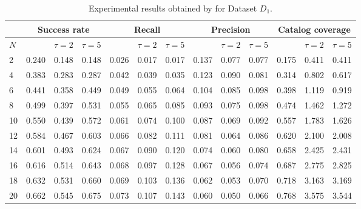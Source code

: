 \begin{table*}[t!]
	\small
\caption{Experimental results obtained by \TFb for Dataset $D_{1}$.}
\begin{tabular}{|l | lll| lll |lll |lll|}
	\hline
	& \multicolumn{3}{c|}{\textbf{Success rate}} & \multicolumn{3}{c|}{\textbf{Recall}} & \multicolumn{3}{c|}{\textbf{Precision}} & \multicolumn{3}{c|}{ \textbf{Catalog coverage}} \\ \hline
	$N$  & \MNB     & $\tau=2$   & $\tau=5$  & \MNB      & $\tau=2$   & $\tau=5$   & \MNB       & $\tau=2$   & $\tau=5$    & \MNB        & $\tau=2$     & $\tau=5$      \\ \hline         
2        & 0.240 & 0.148   & 0.148  & 0.026 & 0.017   & 0.017   & 0.137 & 0.077   & 0.077     & 0.175 & 0.411  & 0.411   \\ \hline
4        & 0.383 & 0.283   & 0.287  & 0.042 & 0.039   & 0.035   & 0.123 & 0.090   & 0.081     & 0.314 & 0.802  & 0.617   \\ \hline
6        & 0.441 & 0.358   & 0.449  & 0.049 & 0.055   & 0.064   & 0.104 & 0.085   & 0.098   & 0.398 & 1.119  & 0.919   \\ \hline
\rowcolor{Gray}
8        & 0.499 & 0.397   & 0.531   & 0.055 & 0.065   & 0.085   & 0.093 & 0.075   & 0.098   & 0.474 & 1.462  & 1.272   \\ \hline
10       & 0.550 & 0.439   & 0.572   & 0.061 & 0.074   & 0.100   & 0.087 & 0.069   & 0.092   & 0.557 & 1.783  & 1.626   \\ \hline
12       & 0.584 & 0.467   & 0.603   & 0.066 & 0.082   & 0.111   & 0.081 & 0.064   & 0.086   & 0.620 & 2.100  & 2.008   \\ \hline
14       & 0.601 & 0.493   & 0.624   & 0.067 & 0.090   & 0.120   & 0.074 & 0.060   & 0.080   & 0.658 & 2.425  & 2.431   \\ \hline
16       & 0.616 & 0.514   & 0.643   & 0.068 & 0.097   & 0.128   & 0.067 & 0.056   & 0.074   & 0.687 & 2.775  & 2.825   \\ \hline
18       & 0.632 & 0.531   & 0.660   & 0.069 & 0.103   & 0.136   & 0.062 & 0.053   & 0.070   & 0.718 & 3.163  & 3.169   \\ \hline
20       & 0.662 & 0.545   & 0.675   & 0.073 & 0.107   & 0.143   & 0.060 & 0.050   & 0.066   & 0.768 & 3.575  & 3.544   \\ \hline
\end{tabular}
\label{tab:combined_dt1}
\end{table*}


